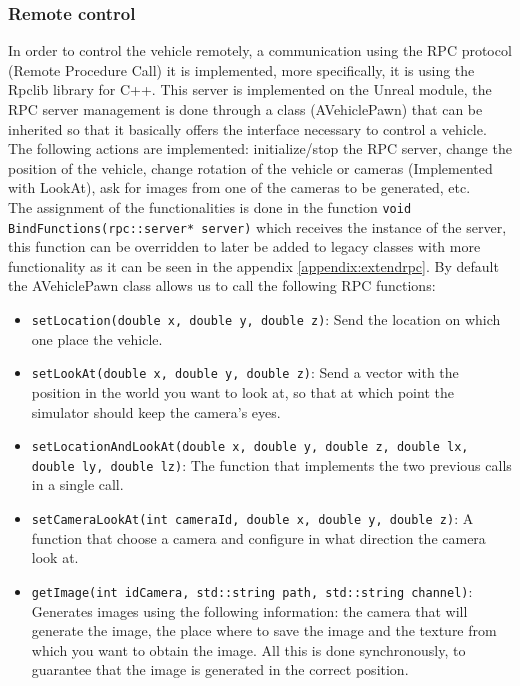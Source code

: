 \documentclass[10pt,a4paper,twocolumn,twoside]{article}
\begin{document}
\subsubsection{Remote control}
\label{rpcserver}

In order to control the vehicle remotely, a communication using the RPC protocol (Remote Procedure Call) it is implemented, more specifically, it is using the Rpclib \cite{rpclib} library for C++. This server is implemented on the Unreal module, the RPC server management is done through a class (AVehiclePawn) that can be inherited so that it basically offers the interface necessary to control a vehicle. The following actions are implemented: initialize/stop the RPC server, change the position of the vehicle, change rotation of the vehicle or cameras (Implemented with LookAt), ask for images from one of the cameras to be generated, etc.
\\
The assignment of the functionalities is done in the function {\tt void BindFunctions(rpc::server* server)} which receives the instance of the server, this function can be overridden to later be added to legacy classes with more functionality as it can be seen in the appendix \ref{appendix:extendrpc}. By default the AVehiclePawn class allows us to call the following RPC functions:

\begin{itemize}
\setlength\itemsep{0em}
\item {\tt setLocation(double x, double y, double z)}: Send the location on which one place the vehicle.

\item {\tt setLookAt(double x, double y, double z)}: Send a vector with the position in the world you want to look at, so that at which point the simulator should keep the camera's eyes.

\item {\tt setLocationAndLookAt(double x, double y, double z, double lx, double ly, double lz)}: The function that implements the two previous calls in a single call.

\item {\tt setCameraLookAt(int cameraId, double x, double y, double z)}: A function that choose a camera and configure in what direction the camera look at.

\item {\tt getImage(int idCamera, std::string path, std::string channel)}: Generates images using the following information: the camera that will generate the image, the place where to save the image and the texture from which you want to obtain the image. All this is done synchronously, to guarantee that the image is generated in the correct position.
\end{itemize}
\end{document}
